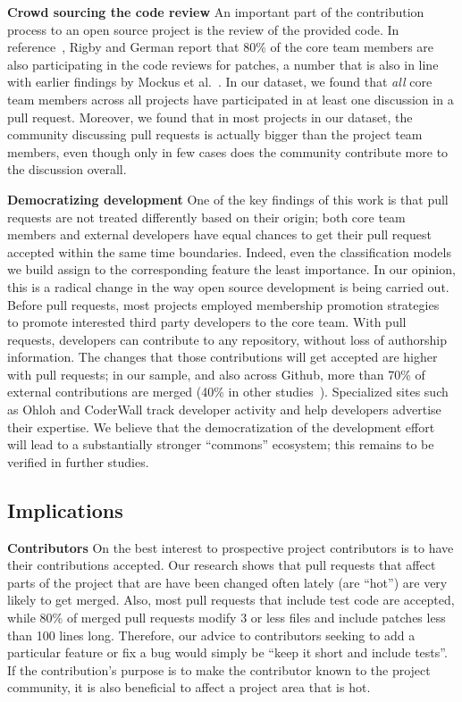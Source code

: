 \documentclass{acm_proc_article-sp}
\begin{document}
\textbf{Crowd sourcing the code review}
An important part of the contribution process to an open source project is the
review of the provided code. In reference~\cite{Rigby06}, Rigby and German
report that 80\% of the core team members are also participating in the code
reviews for patches, a number that is also in line with earlier findings by
Mockus et al.~\cite{MOCKU02}. In our dataset, we found that \emph{all} core
team members across all projects have participated in at least
one discussion in a pull request. Moreover, we found that in most projects
in our dataset, the community discussing pull requests is actually bigger
than the project team members, even though only in few cases does the community
contribute more to the discussion overall.

\textbf{Democratizing development} One of the key findings of this work is
that pull requests are not treated differently based on their origin; both core
team members and external developers have equal chances to get their pull
request accepted within the same time boundaries. Indeed, even the
classification models we build assign to the corresponding feature the least
importance.  In our opinion, this is a radical change in the way open source
development is being carried out. Before pull requests, most projects employed
membership promotion strategies~\cite{Jense07} to promote interested third party
developers to the core team. With pull requests, developers can contribute to
any repository, without loss of authorship information. The changes that those
contributions will get accepted are higher with pull requests; in our sample,
and also across Github, more than 70\% of external contributions are merged
(40\% in other studies~\cite{Rigby06, Weiss08}).  Specialized sites such as
Ohloh and CoderWall track developer activity and help developers advertise their
expertise. We believe that the democratization of the development effort will
lead to a substantially stronger ``commons'' ecosystem; this remains to be
verified in further studies.

\subsection{Implications}

\textbf{Contributors}
On the best interest to prospective project contributors is to have their
contributions accepted. Our research shows that pull requests that affect parts
of the project that are have been changed often lately (are ``hot'') are very
likely to get merged. Also, most pull requests that include test code are
accepted, while 80\% of merged pull requests modify 3 or less files and include
patches less than 100 lines long. Therefore, our advice to contributors seeking
to add a particular feature or fix a bug would simply be ``keep it short and
include tests''. If the contribution's purpose is to make the contributor known
to the project community, it is also beneficial to affect a project area that is
hot.
\end{document}
